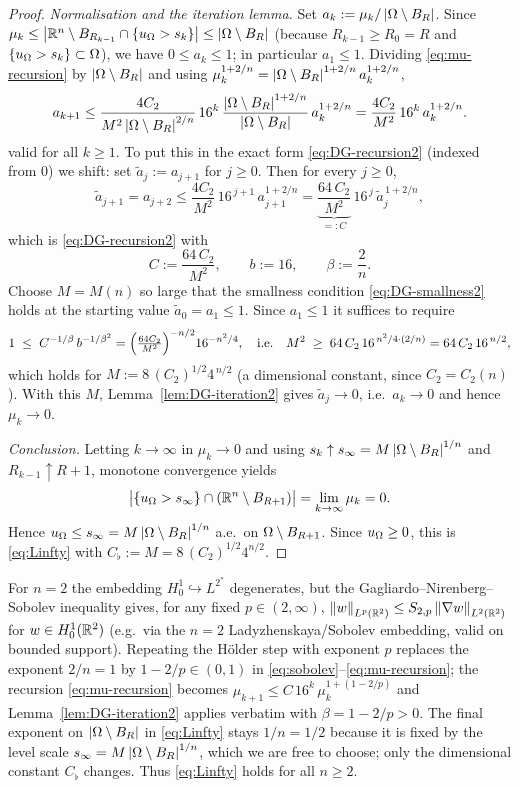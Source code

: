 \begin{proof}
\smallskip
\emph{Normalisation and the iteration lemma.} Set
$a_k:=\mu_k/\left|\Omega\setminus B_R\right|$. Since
$\mu_k\le\left|\mathbb{R}^n\setminus B_{R_{k-1}}\cap\{u_\Omega>s_k\}\right|
\le\left|\Omega\setminus B_R\right|$ (because $R_{k-1}\ge R_0=R$ and
$\{u_\Omega>s_k\}\subset\Omega$), we have $0\le a_k\le1$; in particular
$a_1\le1$. Dividing \eqref{eq:mu-recursion} by
$\left|\Omega\setminus B_R\right|$ and using
$\mu_k^{1+2/n}=\left|\Omega\setminus B_R\right|^{1+2/n}a_k^{1+2/n}$,
\[
   a_{k+1}
   \le\frac{4C_2}{M^2\left|\Omega\setminus B_R\right|^{2/n}}\,16^k\,
   \frac{\left|\Omega\setminus B_R\right|^{1+2/n}}{\left|\Omega\setminus B_R\right|}
   \,a_k^{1+2/n}
   =\frac{4C_2}{M^2}\,16^{k}\,a_k^{1+2/n}.
\]
valid for all $k\ge1$. To put this in the exact form
\eqref{eq:DG-recursion2} (indexed from $0$) we shift: set
$\widetilde a_j:=a_{j+1}$ for $j\ge0$. Then for every $j\ge0$,
\[
   \widetilde a_{j+1}=a_{j+2}
   \le\frac{4C_2}{M^2}\,16^{\,j+1}\,a_{j+1}^{1+2/n}
   =\underbrace{\frac{64\,C_2}{M^2}}_{=:C}\,16^{\,j}\,
     \widetilde a_j^{\,1+2/n},
\]
which is \eqref{eq:DG-recursion2} with
\[
   C:=\frac{64\,C_2}{M^2},\qquad b:=16,\qquad\beta:=\frac2n .
\]
Choose $M=M(n)$ so large that the smallness condition
\eqref{eq:DG-smallness2} holds at the starting value
$\widetilde a_0=a_1\le1$. Since $a_1\le1$ it suffices to require
\[
   1\;\le\;C^{-1/\beta}\,b^{-1/\beta^2}
   =\Bigl(\tfrac{64C_2}{M^2}\Bigr)^{-n/2}16^{-n^2/4},
   \quad\text{i.e.}\quad
   M^2\;\ge\;64\,C_2\,16^{\,n^2/4\cdot(2/n)}=64\,C_2\,16^{\,n/2},
\]
which holds for $M:=8\,(C_2)^{1/2}4^{\,n/2}$ (a dimensional constant,
since $C_2=C_2(n)$). With this $M$, Lemma~\ref{lem:DG-iteration2} gives
$\widetilde a_j\to0$, i.e.\ $a_k\to0$ and hence $\mu_k\to0$.

\smallskip
\emph{Conclusion.} Letting $k\to\infty$ in $\mu_k\to0$ and using
$s_k\uparrow s_\infty=M\left|\Omega\setminus B_R\right|^{1/n}$ and
$R_{k-1}\uparrow R+1$, monotone convergence yields
\[
   \bigl|\{u_\Omega>s_\infty\}\cap(\mathbb{R}^n\setminus B_{R+1})\bigr|
   =\lim_{k\to\infty}\mu_k=0 .
\]
Hence $u_\Omega\le s_\infty=M\left|\Omega\setminus B_R\right|^{1/n}$ a.e.\ on
$\Omega\setminus B_{R+1}$. Since $u_\Omega\ge0$, this is
\eqref{eq:Linfty} with $C_\flat:=M=8\,(C_2)^{1/2}4^{n/2}$.
\end{proof}

\begin{remark}[The case $n=2$]\label{rem:n2}
For $n=2$ the embedding $H^1_0\hookrightarrow L^{2^*}$ degenerates, but
the Gagliardo--Nirenberg--Sobolev inequality gives, for any fixed
$p\in(2,\infty)$,
$\left\|w\right\|_{L^{p}(\mathbb{R}^2)}\le S_{2,p}\left\|\nabla w\right\|_{L^2(\mathbb{R}^2)}$ for
$w\in H^1_0(\mathbb{R}^2)$ (e.g.\ via the $n=2$ Ladyzhenskaya/Sobolev embedding,
valid on bounded support). Repeating the Hölder step with exponent $p$
replaces the exponent $2/n=1$ by $1-2/p\in(0,1)$ in
\eqref{eq:sobolev}--\eqref{eq:mu-recursion}; the recursion
\eqref{eq:mu-recursion} becomes
$\mu_{k+1}\le C\,16^k\,\mu_k^{1+(1-2/p)}$ and Lemma~\ref{lem:DG-iteration2}
applies verbatim with $\beta=1-2/p>0$. The final exponent on
$\left|\Omega\setminus B_R\right|$ in \eqref{eq:Linfty} stays $1/n=1/2$ because it
is fixed by the level scale $s_\infty=M\left|\Omega\setminus B_R\right|^{1/n}$,
which we are free to choose; only the dimensional constant $C_\flat$
changes. Thus \eqref{eq:Linfty} holds for all $n\ge2$.
\end{remark}


